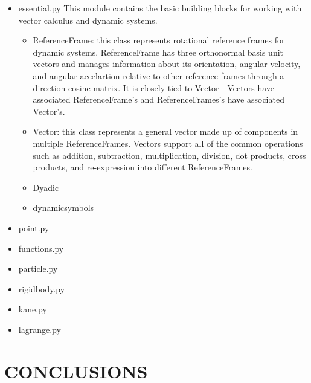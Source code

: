 \documentclass[twocolumn,10pt]{asme2e}
\begin{document}
\begin{itemize}
    \item essential.py
        This module contains the basic building blocks for working
        with vector calculus and dynamic systems.
        \begin{itemize}
            \item ReferenceFrame: this class represents rotational reference
            frames for dynamic systems. ReferenceFrame has three orthonormal
            basis unit vectors and manages information about its orientation,
            angular velocity, and angular accelartion relative to other
            reference frames through a direction cosine matrix. It is closely
            tied to Vector - Vectors have associated ReferenceFrame's and
            ReferenceFrames's have associated Vector's.
            \item Vector: this class represents a general vector made up of
            components in multiple ReferenceFrames.  Vectors support all of the
            common operations such as addition, subtraction, multiplication,
            division, dot products, cross products, and re-expression into
            different ReferenceFrames.
            \item Dyadic
            \item dynamicsymbols
        \end{itemize}
    \item point.py
    \item functions.py
    \item particle.py
    \item rigidbody.py
    \item kane.py
    \item lagrange.py
\end{itemize}




\section*{CONCLUSIONS}



\end{document}
